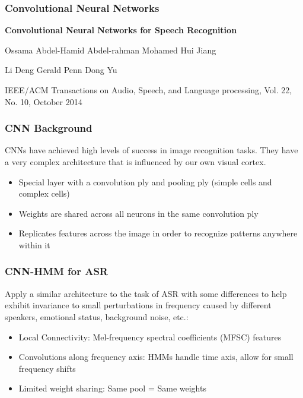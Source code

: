 \documentclass[notes]{beamer}
\begin{document}
\begin{frame}
	\frametitle{Convolutional Neural Networks}
	\begin{center}
		\textbf{Convolutional Neural Networks for Speech Recognition}
	\end{center}
	
	\vfill
	
	\hfill Ossama Abdel-Hamid \hfill Abdel-rahman Mohamed \hfill Hui Jiang 
	
	\hfill Li Deng \hfill Gerald Penn \hfill Dong Yu \hfill
	
	\vfill
	
	\begin{center}
		IEEE/ACM Transactions on Audio, Speech, and Language processing, Vol. 22, No. 10, October 2014
	\end{center}
\end{frame}

\begin{frame}
	\frametitle{CNN Background}
	\begin{center}
		CNNs have achieved high levels of success in image recognition tasks. They have a very complex architecture that is influenced by our own visual cortex.
	\end{center}
		\begin{itemize}
			\item Special layer with a convolution ply and pooling ply (simple cells and complex cells)
			\item Weights are shared across all neurons in the same convolution ply
			\item Replicates features across the image in order to recognize patterns anywhere within it
		\end{itemize}
\end{frame}
\begin{frame}
	\frametitle{CNN-HMM for ASR}
	\begin{center}
		Apply a similar architecture to the task of ASR with some differences to help exhibit invariance to small perturbations in frequency caused by different speakers, emotional status, background noise, etc.:
		\vfill
		\begin{itemize}
			\item Local Connectivity: Mel-frequency spectral coefficients (MFSC) features
			\item Convolutions along frequency axis: HMMs handle time axis, allow for small frequency shifts
			\item Limited weight sharing: Same pool = Same weights
		\end{itemize}
	\end{center}
\end{frame}
\end{document}
